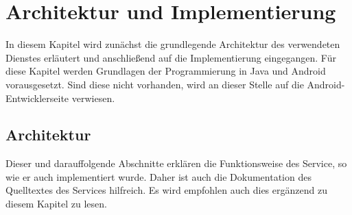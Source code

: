 \documentclass[]{report}
\begin{document}
\chapter{Architektur und Implementierung}
In diesem Kapitel wird zunächst die grundlegende Architektur des verwendeten Dienstes erläutert und anschließend auf die Implementierung eingegangen. Für diese Kapitel werden Grundlagen der Programmierung in Java und Android vorausgesetzt. Sind diese nicht vorhanden, wird an dieser Stelle auf die Android-Entwicklerseite \cite{AndroidDeveoper} verwiesen. 
\section{Architektur}
Dieser und darauffolgende Abschnitte erklären die Funktionsweise des Service, so wie er auch implementiert wurde. Daher ist auch die Dokumentation des Quelltextes des Services hilfreich. Es wird empfohlen auch dies ergänzend zu diesem Kapitel zu lesen. 
\end{document}
